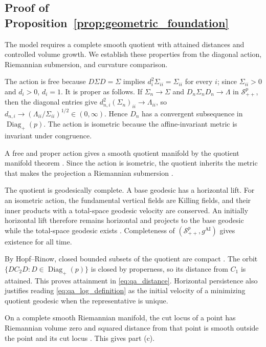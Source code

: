 \documentclass[
  12pt]{article}
\newcommand{\SPD}{\mathcal S_{++}}
\newcommand{\Diagp}{\operatorname{Diag}_{+}}
\newcommand{\AI}{\mathrm{AI}}
\begin{document}
\subsection{Proof of Proposition~\ref{prop:geometric_foundation}}

The model requires a complete smooth quotient with attained distances and controlled volume growth. We establish these properties from the diagonal action, Riemannian submersion, and curvature comparison.

The action is free because $D\Sigma D=\Sigma$ implies $d_i^2\Sigma_{ii}=\Sigma_{ii}$ for every $i$; since $\Sigma_{ii}>0$ and $d_i>0$, $d_i=1$. It is proper as follows. If $\Sigma_n\to\Sigma$ and $D_n\Sigma_nD_n\to\Lambda$ in $\SPD^p$, then the diagonal entries give $d_{n,i}^2(\Sigma_n)_{ii}\to\Lambda_{ii}$, so $d_{n,i}\to(\Lambda_{ii}/\Sigma_{ii})^{1/2}\in(0,\infty)$. Hence $D_n$ has a convergent subsequence in $\Diagp(p)$. The action is isometric because the affine-invariant metric is invariant under congruence.

A free and proper action gives a smooth quotient manifold by the quotient manifold theorem \citep{lee_2012_IntroductionSmoothManifolds}. Since the action is isometric, the quotient inherits the metric that makes the projection a Riemannian submersion \citep{lee_1997_RiemannianManifoldsIntroduction}.

The quotient is geodesically complete. A base geodesic has a horizontal lift. For an isometric action, the fundamental vertical fields are Killing fields, and their inner products with a total-space geodesic velocity are conserved. An initially horizontal lift therefore remains horizontal and projects to the base geodesic while the total-space geodesic exists \citep{oneill_1966_FundamentalEquationsSubmersion}. Completeness of $(\SPD^p,g^{\AI})$ gives existence for all time.

By Hopf--Rinow, closed bounded subsets of the quotient are compact \citep{sakai_1996_RiemannianGeometry}. The orbit $\{DC_2D:D\in\Diagp(p)\}$ is closed by properness, so its distance from $C_1$ is attained. This proves attainment in \eqref{eq:qa_distance}. Horizontal persistence also justifies reading \eqref{eq:qa_log_definition} as the initial velocity of a minimizing quotient geodesic when the representative is unique.

On a complete smooth Riemannian manifold, the cut locus of a point has Riemannian volume zero and squared distance from that point is smooth outside the point and its cut locus \citep{sakai_1996_RiemannianGeometry}. This gives part (c).
\end{document}

